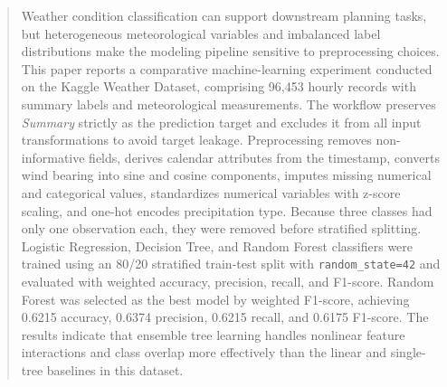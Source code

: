 \documentclass[10pt,letterpaper,twocolumn]{article}
\begin{document}

\begin{abstract}
Weather condition classification can support downstream planning tasks, but heterogeneous meteorological variables and imbalanced label distributions make the modeling pipeline sensitive to preprocessing choices. This paper reports a comparative machine-learning experiment conducted on the Kaggle Weather Dataset, comprising 96,453 hourly records with summary labels and meteorological measurements. The workflow preserves \textit{Summary} strictly as the prediction target and excludes it from all input transformations to avoid target leakage. Preprocessing removes non-informative fields, derives calendar attributes from the timestamp, converts wind bearing into sine and cosine components, imputes missing numerical and categorical values, standardizes numerical variables with z-score scaling, and one-hot encodes precipitation type. Because three classes had only one observation each, they were removed before stratified splitting. Logistic Regression, Decision Tree, and Random Forest classifiers were trained using an 80/20 stratified train-test split with \texttt{random\_state=42} and evaluated with weighted accuracy, precision, recall, and F1-score. Random Forest was selected as the best model by weighted F1-score, achieving 0.6215 accuracy, 0.6374 precision, 0.6215 recall, and 0.6175 F1-score. The results indicate that ensemble tree learning handles nonlinear feature interactions and class overlap more effectively than the linear and single-tree baselines in this dataset.
\end{abstract}
\end{document}
